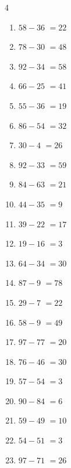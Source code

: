 \begin{multicols}{4}
\begin{enumerate}
  \item $58-36$
        $=22$

  \item $78-30$
        $=48$

  \item $92-34$
        $=58$

  \item $66-25$
        $=41$

  \item $55-36$
        $=19$

  \item $86-54$
        $=32$

  \item $30-4$
        $=26$

  \item $92-33$
        $=59$

  \item $84-63$
        $=21$

  \item $44-35$
        $=9$

  \item $39-22$
        $=17$

  \item $19-16$
        $=3$

  \item $64-34$
        $=30$

  \item $87-9$
        $=78$

  \item $29-7$
        $=22$

  \item $58-9$
        $=49$

\columnbreak %

\resetques

  \item $97-77$
        $=20$

  \item $76-46$
        $=30$

  \item $57-54$
        $=3$

  \item $90-84$
        $=6$

  \item $59-49$
        $=10$

  \item $54-51$
        $=3$

  \item $97-71$
        $=26$


\end{enumerate}
\end{multicols}
